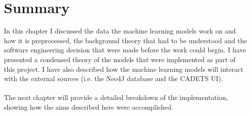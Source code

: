 	\section{Summary} \label{Section 2.8}
	In this chapter I discussed the data the machine learning models work on and how it is preprocessed, the background theory that had to be understood and the software engineering decision that were made before the work could begin. I have presented a condensed theory of the models that were implemented as part of this project. I have also described how the machine learning models will interact with the external sources (i.e. the Neo4J database and the CADETS UI).
	\\ \\
	The next chapter will provide a detailed breakdown of the implementation, showing how the aims described here were accomplished. 
	
